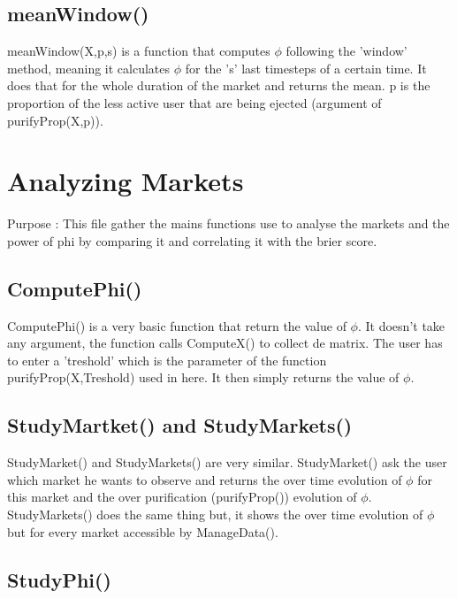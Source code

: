 \documentclass{report}
\begin{document}
\subsection{meanWindow()}

meanWindow(X,p,s) is a function that computes $\phi $ following the 'window' method, meaning it calculates $\phi $ for the 's' last timesteps of a certain time. It does that for the whole duration of the market and returns the mean. p is the proportion of the less active user that are being ejected (argument of purifyProp(X,p)).

\section{Analyzing Markets}

Purpose : This file gather the mains functions use to analyse the markets and the power of phi by comparing it and correlating it with the brier score.

\subsection{ComputePhi()}

ComputePhi() is a very basic function that return the value of $\phi $. It doesn't take any argument, the function calls ComputeX() to collect de matrix. The user has to enter a 'treshold' which is the parameter of the function purifyProp(X,Treshold) used in here. It then simply returns the value of $\phi $.

\subsection{StudyMartket() and StudyMarkets()}

StudyMarket() and StudyMarkets() are very similar. StudyMarket() ask the user which market he wants to observe and returns the over time evolution of $\phi $ for this market and the over purification (purifyProp()) evolution of $\phi $.\\
StudyMarkets() does the same thing but, it shows the over time evolution of $\phi $ but for every market accessible by ManageData().

\subsection{StudyPhi()}
\end{document}
